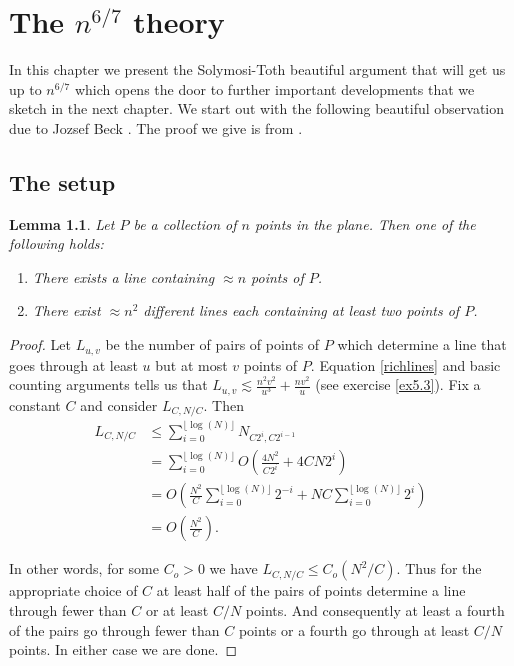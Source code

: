 \documentclass[]{stml-l}
\numberwithin{equation}{chapter}
\theoremstyle{plain}
\newtheorem{lemma}[equation]{Lemma}
\theoremstyle{definition}
\theoremstyle{remark}
\begin{document}
\chapter{The $n^{6/7}$ theory}


In this chapter we present the Solymosi-Toth beautiful argument
that will get us up to $n^{6/7}$ which opens the door to
further important developments that we sketch in the next chapter.
We start out with the following beautiful observation due to
Jozsef Beck \cite{Beck}.  The proof we give is from \cite{Sol2}.

\section{The setup} 

\begin{lemma} \label{Beck}
Let $P$ be a collection of $n$ points in the plane. Then
one of the following holds:
\begin{enumerate}
\item There exists a line containing  $\approx n$ points of $P$.
\item There exist $ \approx n^2$ different lines each
containing at least two points of $P$.
\end{enumerate}
\end{lemma}


\begin{proof}
Let $L_{u,v}$ be the number of pairs of points of $P$ which
determine a line that goes through at least $u$ but at most $v$
points of $P$.  Equation \ref{richlines} and basic counting
arguments tells us that $L_{u,v} \lesssim \frac{n^2v^2}{u^3} +
\frac{nv^2}{u}$ (see exercise \ref{ex5.3}).  Fix a constant $C$
and consider $L_{C, N/C}$.  Then
\begin{equation}
\begin{split}
L_{C, N/C} &\leq \sum_{i=0}^{\lfloor \log(N) \rfloor} N_{C2^i, C2^{i-1}} \\
&= \sum_{i=0}^{\lfloor \log(N) \rfloor} O\left( \frac{4N^2}{C2^i} + 4CN2^i \right)  \\
&=  O \left( \frac{N^2}{C} \sum_{i=0}^{\lfloor \log(N) \rfloor} 2^{-i} + NC \sum_{i=0}^{\lfloor \log(N) \rfloor} 2^i \right) \\
&= O\left( \frac{N^2}{C} \right).
\end{split}
\end{equation}


In other words, for some $C_o > 0$ we have $L_{C, N/C} \leq C_o
\left( N^2/C \right)$.  Thus for the appropriate choice of $C$ at
least half of the pairs of points determine a line through fewer
than $C$ or at least $C/N$ points.  And consequently at least a
fourth of the pairs go through fewer than $C$ points or a fourth
go through at least $C/N$ points.  In either case we are done.
\end{proof}
\end{document}
